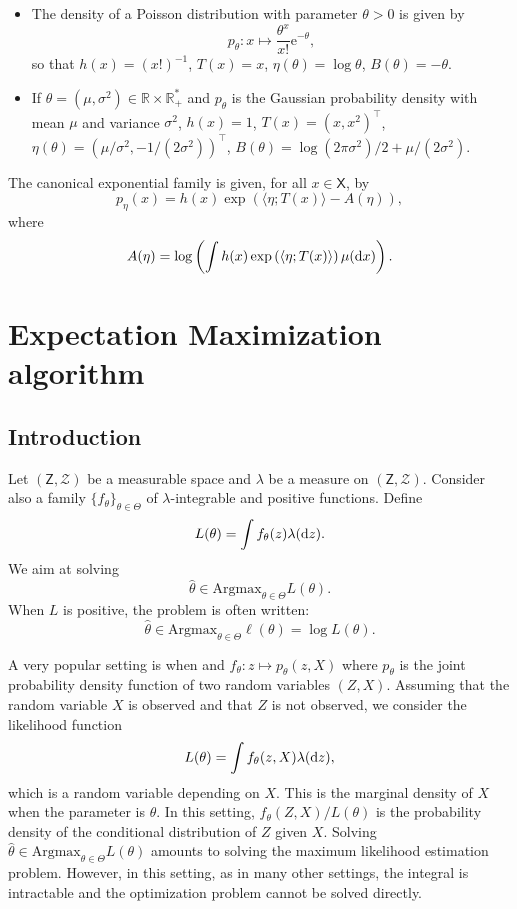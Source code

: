 \documentclass[english,graybox,envcountchap,envcountsame,sectrefs,shortlabels]{svmono}
\theoremstyle{style}
\newcommand{\Zset}{\mathsf{Z}}
\newcommand{\Zsigma}{\mathcal{Z}}
\newcommand{\rme}{\mathrm{e}}
\newcommand{\eqsp}{}
\newcommand{\Xset}{\mathsf{X}}
\begin{document}
\begin{example}
\begin{itemize}
\item The density of a Poisson distribution with parameter $\theta>0$ is given by
$$
p_\theta:x \mapsto \frac{\theta^x}{x!} \rme^{-\theta}\eqsp,
$$
so that $h(x) = (x!)^{-1}$, $T(x)=x$, $\eta(\theta) = \log \theta$, $B(\theta) = -\theta$.
\item If $\theta = (\mu,\sigma^2)\in\mathbb{R}\times\mathbb{R}_+^*$ and $p_\theta$ is the Gaussian probability density with mean $\mu$ and variance $\sigma^2$, $h(x) = 1$, $T(x)=(x,x^2)^\top$, $\eta(\theta) = (\mu/\sigma^2,-1/(2\sigma^2))^\top$, $B(\theta) = \log(2\pi\sigma^2)/2 + \mu/(2\sigma^2)$.
\end{itemize}
\end{example}
The canonical exponential family is given, for all $x\in\Xset$, by 
$$
p_\eta(x) = h(x)\exp\left(\langle \eta;T(x)\rangle - A(\eta)\right)\eqsp,
$$
where
$$
A(\eta) = \log\left(\int h(x)\exp\left(\langle \eta;T(x)\rangle \right)\mu(\rmd x)\right)\eqsp.
$$

\chapter{Expectation Maximization algorithm}

\section{Introduction}
Let $(\Zset,\Zsigma)$ be a measurable space and $\lambda$ be a measure on $(\Zset,\Zsigma)$. Consider also a family $\{f_\theta\}_{\theta\in\Theta}$ of $\lambda$-integrable and positive functions. Define
$$
L(\theta) = \int f_\theta(z)\lambda(\rmd z)\eqsp.
$$
We aim at solving
$$
\widehat \theta \in\mathrm{Argmax}_{\theta\in\Theta} L(\theta)\eqsp.
$$
When $L$ is positive, the problem is often written:
$$
\widehat \theta \in\mathrm{Argmax}_{\theta\in\Theta} \ell(\theta) = \log L(\theta)\eqsp.
$$

\begin{example}
\label{ex:EM}
A very popular setting is when  and $f_\theta: z \mapsto p_\theta(z,X)$ where $p_\theta$ is the joint probability density function of two random variables $(Z,X)$. Assuming that the random variable $X$ is observed and that $Z$ is not observed, we consider the likelihood function
$$
L(\theta) = \int f_\theta(z,X)\lambda(\rmd z)\eqsp,
$$
which is a random variable depending on $X$. This is the marginal density of $X$ when the parameter is $\theta$. In this setting, $f_\theta(Z,X)/L(\theta)$ is the probability density of the conditional distribution of $Z$ given $X$.  Solving $\widehat \theta \in\mathrm{Argmax}_{\theta\in\Theta} L(\theta)$ amounts to solving the maximum likelihood estimation problem. However, in this setting, as in many other settings, the integral is intractable and the optimization problem cannot be solved directly.
\end{example}
\end{document}
